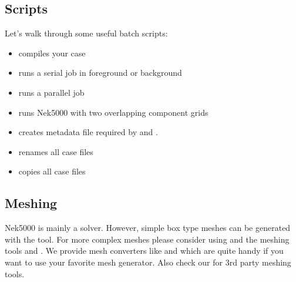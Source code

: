 \documentclass[letterpaper,10pt,english]{sphinxmanual}
\begin{document}
\subsection{Scripts}
\label{\detokenize{quickstart:scripts}}
Let’s walk through some useful batch scripts:
\begin{itemize}
\item {} 
 compiles your case

\item {} 
 runs a serial job in foreground or background

\item {} 
 runs a parallel job

\item {} 
 runs Nek5000 with two overlapping component grids

\item {} 
 creates metadata file required by  and .

\item {} 
 renames all case files

\item {} 
 copies all case files

\end{itemize}


\subsection{Meshing}
\label{\detokenize{quickstart:meshing}}
Nek5000 is mainly a solver. However, simple box type meshes can be generated with the  tool. For more complex meshes please consider using  and the meshing tools  and . We provide mesh converters like  and  which are quite handy if you want to use your favorite mesh generator. Also check our
 for 3rd party meshing tools.
\end{document}
